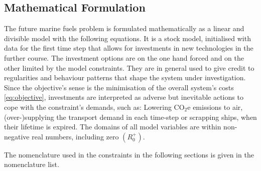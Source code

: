 \documentclass[article]{elsarticle}
\begin{document}
\subsection{Mathematical Formulation}
\label{subsec:Mat}
The future marine fuels problem is formulated mathematically as a linear and divisible model with the following equations. It is a stock model, initialised with data for the first time step that allows for investments in new technologies in the further course. The investment options are on the one hand forced and on the other limited by the model constraints. They are in general used to give credit to regularities and behaviour patterns that shape the system under investigation. Since the objective's sense is the minimisation of the overall system's costs \cref{eq:objective}, investments are interpreted as adverse but inevitable actions to cope with the constraint's demands, such as: Lowering CO$_2$e emissions to air, (over-)supplying the transport demand in each time-step or scrapping ships, when their lifetime is expired. The domains of all model variables are within non-negative real numbers, including zero $\left(R_{0}^{+}\right)$.

The nomenclature used in the constraints in the following sections is given in the nomenclature list.
\glsdisablehyper
\glsaddall
\begin{table}[htb] 
\renewcommand\tablename{Nomenclature list}
\begin{mdframed}
\footnotesize{
\begin{multicols}{2}
\printglossary[style=tree,type=a]
\vspace{-0.3cm}
\printglossary[style=tree,type=s]
\vspace{-0.3cm}
\printglossary[style=tree,type=v]
\vspace{-0.3cm}
\printglossary[style=tree,type=p]
\end{multicols}
}
\end{mdframed}
\caption{}
\end{table}
\end{document}
